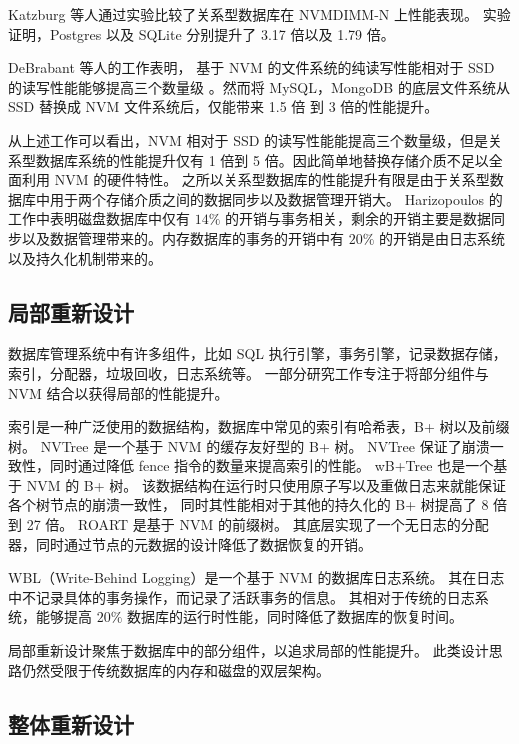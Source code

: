 Katzburg 等人通过实验比较了关系型数据库在 NVMDIMM-N 上性能表现\cite{katzburg_nvdimm-n_2018}。
实验证明，Postgres 以及 SQLite 分别提升了 3.17 倍以及 1.79 倍。

DeBrabant 等人的工作表明，
基于 NVM 的文件系统的纯读写性能相对于 SSD 的读写性能能够提高三个数量级
\cite{debrabant_prolegomenon_2014}。然而将 MySQL，MongoDB 的底层文件系统从 SSD 替换成 NVM 文件系统后，仅能带来 1.5 倍 到 3 倍的性能提升。

从上述工作可以看出，NVM 相对于 SSD 的读写性能能提高三个数量级，但是关系型数据库系统的性能提升仅有 1 倍到 5 倍。因此简单地替换存储介质不足以全面利用 NVM 的硬件特性。
之所以关系型数据库的性能提升有限是由于关系型数据库中用于两个存储介质之间的数据同步以及数据管理开销大。
Harizopoulos 的工作中表明磁盘数据库中仅有 $14\%$ 的开销与事务相关，剩余的开销主要是数据同步以及数据管理带来的\cite{harizopoulos_oltp_2018}。内存数据库的事务的开销中有 $20\%$ 的开销是由日志系统以及持久化机制带来的。


\subsection{局部重新设计}

数据库管理系统中有许多组件，比如 SQL 执行引擎，事务引擎，记录数据存储，索引，分配器，垃圾回收，日志系统等。
一部分研究工作专注于将部分组件与 NVM 结合以获得局部的性能提升。

索引是一种广泛使用的数据结构，数据库中常见的索引有哈希表，B+ 树以及前缀树。
NVTree\cite{nv-tree} 是一个基于 NVM 的缓存友好型的 B+ 树。
NVTree 保证了崩溃一致性，同时通过降低 fence 指令的数量来提高索引的性能。
wB+Tree\cite{chen2015persistent} 也是一个基于 NVM 的 B+ 树。
该数据结构在运行时只使用原子写以及重做日志来就能保证各个树节点的崩溃一致性，
同时其性能相对于其他的持久化的 B+ 树提高了 8 倍到 27 倍。
ROART\cite{ma_roart_2021} 是基于 NVM 的前缀树。
其底层实现了一个无日志的分配器，同时通过节点的元数据的设计降低了数据恢复的开销。

WBL（Write-Behind Logging）是一个基于 NVM 的数据库日志系统\cite{wbl}。
其在日志中不记录具体的事务操作，而记录了活跃事务的信息。
其相对于传统的日志系统，能够提高 $20\%$ 数据库的运行时性能，同时降低了数据库的恢复时间。

局部重新设计聚焦于数据库中的部分组件，以追求局部的性能提升。
此类设计思路仍然受限于传统数据库的内存和磁盘的双层架构。

\subsection{整体重新设计}

